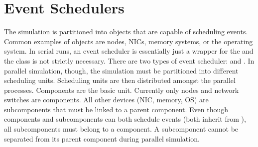 \section{Event Schedulers}
The simulation is partitioned into objects that are capable of scheduling events.
Common examples of \evscheduler objects are nodes, NICs, memory systems, or the operating system.
In serial runs, an event scheduler is essentially just a wrapper for the \evmgr and the class is not strictly necessary.
There are two types of event scheduler:  and .
In parallel simulation, though, the simulation must be partitioned into different scheduling units.
Scheduling units are then distributed amongst the parallel processes.
Components are the basic unit.  Currently only nodes and network switches are components.
All other devices (NIC, memory, OS) are subcomponents that must be linked to a parent component.
Even though components and subcomponents can both schedule events (both inherit from \evscheduler),
all subcomponents must belong to a component.  A subcomponent cannot be separated from its parent component during parallel simulation.



